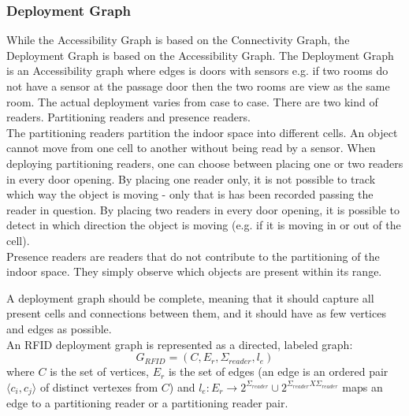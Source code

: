 
\subsubsection{ \qquad Deployment Graph}
While the Accessibility Graph is based on the Connectivity Graph, the Deployment Graph is based on the Accessibility Graph. 
The Deployment Graph is an Accessibility graph where edges is doors with sensors e.g. if two rooms do not have a sensor at the passage door then the two rooms are view as the same room.
The actual deployment varies from case to case. 
There are two kind of readers. 
Partitioning readers and presence readers. \\

The partitioning readers partition the indoor space into different cells. 
An object cannot move from one cell to another without being read by a sensor. 
When deploying partitioning readers, one can choose between placing one or two readers in every door opening. 
By placing one reader only, it is not possible to track which way the object is moving - only that is has been recorded passing the reader in question. 
By placing two readers in every door opening, it is possible to detect in which direction the object is moving (e.g. if it is moving in or out of the cell). \\

Presence readers are readers that do not contribute to the partitioning of the indoor space. 
They simply observe which objects are present within its range. 

A deployment graph should be complete, meaning that it should capture all present cells and connections between them, and it should have as few vertices and edges as possible. \\
An RFID deployment graph is represented as a directed, labeled graph:
\begin{equation}
G_{RFID} = (C, E_r, \Sigma_{reader}, l_e)
\end{equation} 
where $C$ is the set of vertices, $E_r$ is the set of edges (an edge is an ordered pair $\langle c_i, c_j \rangle$ of distinct vertexes from $C$) and $l_e : E_r \rightarrow 2^{\Sigma_{reader}} \cup 2^{\Sigma_{reader} X \Sigma_{reader}}$ maps an edge to a partitioning reader or a partitioning reader pair. \\

